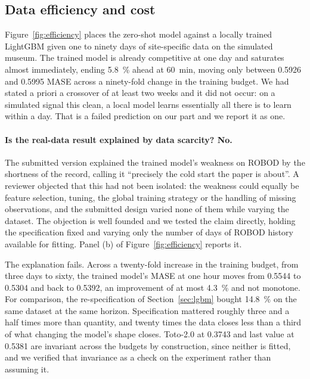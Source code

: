 \documentclass[11pt]{article}
\theoremstyle{plain}
\theoremstyle{definition}
\theoremstyle{remark}
\newif\ifrevisionmarkup
\newcommand{\new}[1]{\ifrevisionmarkup\textcolor{revision}{#1}\else#1\fi}
\begin{document}
\subsection{Data efficiency and cost}
\label{sec:efficiency}

Figure~\ref{fig:efficiency} places the zero-shot model against a locally trained LightGBM given one to ninety days of site-specific data on the simulated museum. The trained model is already competitive at one day and saturates almost immediately, ending \SI{5.8}{\percent} ahead at \SI{60}{\minute}, moving only between \num{0.5926} and \num{0.5995} MASE across a ninety-fold change in the training budget. We had \new{stated a priori} a crossover of at least two weeks and it did not occur: on a simulated signal this clean, a local model learns essentially all there is to learn within a day. That is a failed prediction on our part and we report it as one.

\new{\paragraph{Is the real-data result explained by data scarcity? No.} The submitted version explained the trained model's weakness on ROBOD by the shortness of the record, calling it ``precisely the cold start the paper is about''. A reviewer objected that this had not been isolated: the weakness could equally be feature selection, tuning, the global training strategy or the handling of missing observations, and the submitted design varied none of them while varying the dataset. The objection is well founded and we tested the claim directly, holding the specification fixed and varying only the number of days of ROBOD history available for fitting. Panel (b) of Figure~\ref{fig:efficiency} reports it.}

\new{The explanation fails. Across a twenty-fold increase in the training budget, from three days to sixty, the trained model's MASE at one hour moves from \num{0.5544} to \num{0.5304} and back to \num{0.5392}, an improvement of at most \SI{4.3}{\percent} and not monotone. For comparison, the re-specification of Section~\ref{sec:lgbm} bought \SI{14.8}{\percent} on the same dataset at the same horizon. Specification mattered roughly three and a half times more than quantity, and twenty times the data closes less than a third of what changing the model's shape closes. Toto-2.0 at \num{0.3743} and last value at \num{0.5381} are invariant across the budgets by construction, since neither is fitted, and we verified that invariance as a check on the experiment rather than assuming it.}
\end{document}
